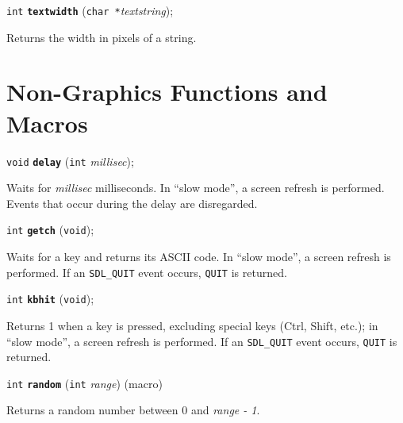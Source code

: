 \documentclass[a4paper,12pt]{article}
\newcommand{\V}{\texttt{void}}      %
\newcommand{\I}{\texttt{int}}       %
\newcommand{\C}{\texttt{char *}}    %
\newcommand{\func}[1]{\textbf{\texttt{#1}}}  %
\newcommand{\A}[1]{\emph{#1}}       %
\newcommand{\T}[1]{\texttt{#1}}     %
\newenvironment{bgi}
{ %
  \begin{snugshade}
}
{ %
  \end{snugshade}
}
\begin{document}

\label{sec:textwidth}

\begin{bgi}
\I{} \func{textwidth} (\C{}\A{textstring});
\end{bgi}

Returns the width in pixels of a string.


\section{Non-Graphics Functions and Macros}

\begin{bgi}
\V{} \func{delay} (\I{} \A{millisec});
\end{bgi}

Waits for \A{millisec} milliseconds. In ``slow mode'', a screen
refresh is performed. Events that occur during the delay are
disregarded.


\label{sec:getch}

\begin{bgi}
\I{} \func{getch} (\V{});
\end{bgi}

Waits for a key and returns its ASCII code. In ``slow mode'', a screen
refresh is performed. If an \T{SDL\_QUIT} event occurs, \T{QUIT} is
returned.


\label{sec:kbhit}

\begin{bgi}
\I{} \func{kbhit} (\V{});
\end{bgi}

Returns 1 when a key is pressed, excluding special keys (Ctrl, Shift,
etc.); in ``slow mode'', a screen refresh is performed. If an
\T{SDL\_QUIT} event occurs, \T{QUIT} is returned.


\label{sec:random}

\begin{bgi}
\I{} \func{random} (\I{} \A{range}) (macro)
\end{bgi}

Returns a random number between 0 and \A{range - 1}.
\end{document}
